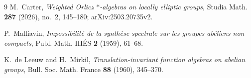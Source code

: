 \documentclass[11pt]{article}
\begin{document}
\begin{thebibliography}{9}
M.~Carter,
\emph{Weighted Orlicz $*$-algebras on locally elliptic groups},
Studia Math. \textbf{287} (2026), no.~2, 145--180;
arXiv:2503.20735v2.

P.~Malliavin,
\emph{Impossibilit\'e de la synth\`ese spectrale sur les groupes ab\'eliens
non compacts},
Publ. Math. IH\'ES \textbf{2} (1959), 61--68.

K.~de Leeuw and H.~Mirkil,
\emph{Translation-invariant function algebras on abelian groups},
Bull. Soc. Math. France \textbf{88} (1960), 345--370.
\end{thebibliography}
\end{document}
